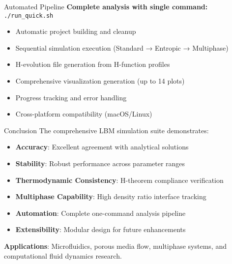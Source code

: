 \documentclass{beamer}
\begin{document}
\begin{frame}{Automated Pipeline}
  \textbf{Complete analysis with single command:} \texttt{{./run\_quick.sh}}
  
  \begin{itemize}
    \item Automatic project building and cleanup
    \item Sequential simulation execution (Standard → Entropic → Multiphase)
    \item H-evolution file generation from H-function profiles
    \item Comprehensive visualization generation (up to 14 plots)
    \item Progress tracking and error handling
    \item Cross-platform compatibility (macOS/Linux)
  \end{itemize}
\end{frame}

\begin{frame}{Conclusion}
  The comprehensive LBM simulation suite demonstrates:
  \begin{itemize}
    \item \textbf{Accuracy}: Excellent agreement with analytical solutions
    \item \textbf{Stability}: Robust performance across parameter ranges
    \item \textbf{Thermodynamic Consistency}: H-theorem compliance verification
    \item \textbf{Multiphase Capability}: High density ratio interface tracking
    \item \textbf{Automation}: Complete one-command analysis pipeline
    \item \textbf{Extensibility}: Modular design for future enhancements
  \end{itemize}
  
  \vspace{0.5cm}
  \textbf{Applications}: Microfluidics, porous media flow, multiphase systems, and computational fluid dynamics research.
\end{frame}
\end{document}
